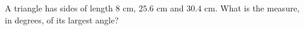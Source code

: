 A triangle has sides of length $8$ cm, $25.6$ cm and $30.4$ cm. What is the measure, in degrees, of its largest angle?
